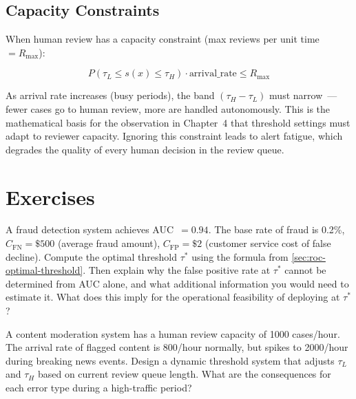\subsection{Capacity Constraints}

When human review has a capacity constraint (max reviews per unit time $= R_{\max}$):

\[
P\!\left(\tau_L \leq s(x) \leq \tau_H\right) \cdot \text{arrival\_rate} \leq R_{\max}
\]

\begin{keyconcept}
As arrival rate increases (busy periods), the band $(\tau_H - \tau_L)$ must narrow~--- fewer cases go to human review, more are handled autonomously. This is the mathematical basis for the observation in Chapter~4 that threshold settings must adapt to reviewer capacity. Ignoring this constraint leads to alert fatigue, which degrades the quality of every human decision in the review queue.
\end{keyconcept}

\section{Exercises}

\begin{Exercise}
A fraud detection system achieves AUC~$= 0.94$. The base rate of fraud is 0.2\%, $C_{\mathrm{FN}} = \$500$ (average fraud amount), $C_{\mathrm{FP}} = \$2$ (customer service cost of false decline). Compute the optimal threshold $\tau^*$ using the formula from \cref{sec:roc-optimal-threshold}. Then explain why the false positive rate at $\tau^*$ cannot be determined from AUC alone, and what additional information you would need to estimate it. What does this imply for the operational feasibility of deploying at $\tau^*$?
\end{Exercise}

\begin{Exercise}
A content moderation system has a human review capacity of 1000 cases/hour. The arrival rate of flagged content is 800/hour normally, but spikes to 2000/hour during breaking news events. Design a dynamic threshold system that adjusts $\tau_L$ and $\tau_H$ based on current review queue length. What are the consequences for each error type during a high-traffic period?
\end{Exercise}

